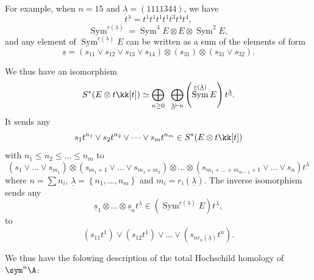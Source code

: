 \documentclass[12pt,a4paper,reqno]{amsart}
\DeclareMathOperator\Sym{Sym}
\begin{document}
For example, when $n = 15$ and $\underline{\lambda} = (1111344)$, we
have
$$ t^{\underline{\lambda}} = t^1 t^1 t^1 t^1 t^3 t^4 t^4, $$
$$ \Sym^{\underline{r}(\underline{\lambda})} = 
\Sym^4 E \otimes E \otimes \Sym^2 E, $$
and any element of $\Sym^{\underline{r}(\underline{\lambda})} E$ 
can be written as a sum of the elements of form
$$ \underline{s} = (s_{11} \vee s_{12} \vee s_{13} \vee s_{14})
\otimes (s_{31}) \otimes (s_{31} \vee s_{32}). $$

We thus have an isomorphism 
\begin{equation}
\label{eqn-symmetric-algebra-decomposition}
S^*(E \otimes t \kk[t]) \simeq 
\bigoplus_{n \geq 0} \;\;
\bigoplus_{
\underline{\lambda} \vdash n 
}
\left(\Sym^{\underline{r}(\underline{\lambda})} E\right) t^{\underline{\lambda}}. 
\end{equation}
It sends any
$$ s_1 t^{n_1} \vee s_2 t^{n_2} \vee \dots \vee s_{m} t^{n_m} \in
S^*(E \otimes t \kk[t]) $$
with $n_1 \leq n_2 \leq \dots \leq n_m$ to 
$$ (s_1 \vee \dots \vee s_{m_1}) \otimes
(s_{m_1+1} \vee \dots \vee s_{m_1+m_2}) \otimes \dots \otimes
(s_{m_1 + \dots + m_{m-1} + 1} \vee \dots \vee s_n) t^{\underline{\lambda}} $$
where $n = \sum n_i$, $\underline{\lambda} = \left\{n_1, \dots, n_m\right\}$
and $m_i = r_i(\underline{\lambda})$. 
The inverse isomorphism sends any 
$$ \underline{s}_1 \otimes \dots \otimes \underline{s}_n
t^{\underline{\lambda}} \in \left(\Sym^{\underline{r}(\underline{\lambda})}
E\right) t^{\underline{\lambda}},
$$
to 
$$ (s_{11} t^1) \vee (s_{12} t^1) \vee \dots \vee (s_{n
r_n(\underline{\lambda})} t^n). $$

We thus have the folowing description of the total Hochschild homology of $\sym^n \A$: 
\end{document}
